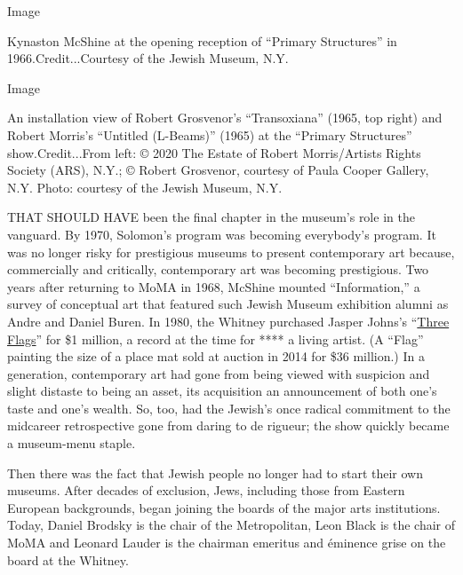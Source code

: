 Image

Kynaston McShine at the opening reception of ``Primary Structures'' in
1966.Credit...Courtesy of the Jewish Museum, N.Y.

Image

An installation view of Robert Grosvenor's ``Transoxiana'' (1965, top
right) and Robert Morris's ``Untitled (L-Beams)'' (1965) at the
``Primary Structures'' show.Credit...From left: © 2020 The Estate of
Robert Morris/Artists Rights Society (ARS), N.Y.; © Robert Grosvenor,
courtesy of Paula Cooper Gallery, N.Y. Photo: courtesy of the Jewish
Museum, N.Y.

THAT SHOULD HAVE been the final chapter in the museum's role in the
vanguard. By 1970, Solomon's program was becoming everybody's program.
It was no longer risky for prestigious museums to present contemporary
art because, commercially and critically, contemporary art was becoming
prestigious. Two years after returning to MoMA in 1968, McShine mounted
``Information,'' a survey of conceptual art that featured such Jewish
Museum exhibition alumni as Andre and Daniel Buren. In 1980, the Whitney
purchased Jasper Johns's
``\href{https://whitney.org/collection/works/1060}{Three Flags}'' for
\$1 million, a record at the time for **** a living artist. (A ``Flag''
painting the size of a place mat sold at auction in 2014 for \$36
million.) In a generation, contemporary art had gone from being viewed
with suspicion and slight distaste to being an asset, its acquisition an
announcement of both one's taste and one's wealth. So, too, had the
Jewish's once radical commitment to the midcareer retrospective gone
from daring to de rigueur; the show quickly became a museum-menu staple.

Then there was the fact that Jewish people no longer had to start their
own museums. After decades of exclusion, Jews, including those from
Eastern European backgrounds, began joining the boards of the major arts
institutions. Today, Daniel Brodsky is the chair of the Metropolitan,
Leon Black is the chair of MoMA and Leonard Lauder is the chairman
emeritus and éminence grise on the board at the Whitney.

